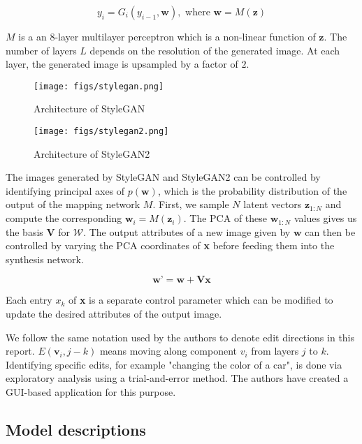 \begin{equation}
  y_i = G_i(y_{i-1}, \mathbf{w}),\text{ where }\mathbf{w} = M(\mathbf{z})
\end{equation}

$M$ is a an $8$-layer multilayer perceptron which is a non-linear function of $\mathbf{z}$. The number of layers $L$ depends on the resolution of the generated image. At each layer, the generated image is upsampled by a factor of $2$.

\begin{figure}[H]
  \centering
  \texttt{[image: figs/stylegan.png]}
  \caption{Architecture of StyleGAN \cite{stylegan}}
  \label{fig:stylegan}
\end{figure}

\begin{figure}[H]
  \centering
  \texttt{[image: figs/stylegan2.png]}
  \caption{Architecture of StyleGAN2 \cite{stylegan2}}
  \label{fig:stylegan2}
\end{figure}

The images generated by StyleGAN and StyleGAN2 can be controlled by identifying principal axes of $p(\textbf{w})$, which is the probability distribution of the output of the mapping network $M$. First, we sample $N$ latent vectors $\textbf{z}_{1:N}$ and compute the corresponding $\textbf{w}_{i} = M(\textbf{z}_{i})$. The PCA of these $\textbf{w}_{1:N}$ values gives us the basis $\textbf{V}$ for $\mathcal{W}$. The output attributes of a new image given by $\textbf{w}$ can then be controlled by varying the PCA coordinates of \textbf{x} before feeding them into the synthesis network. 

\begin{equation}
    \textbf{w'} = \textbf{w} + \textbf{Vx}
\end{equation}

Each entry $x_{k}$ of \textbf{x} is a separate control parameter which can be modified to update the desired attributes of the output image.

We follow the same notation used by the authors to denote edit directions in this report. $E(\textbf{v}_{i}, j-k)$ means moving along component $v_{i}$ from layers $j$ to $k$. Identifying specific edits, for example "changing the color of a car", is done via exploratory analysis using a trial-and-error method. The authors have created a GUI-based application for this purpose.

\subsection{Model descriptions}

